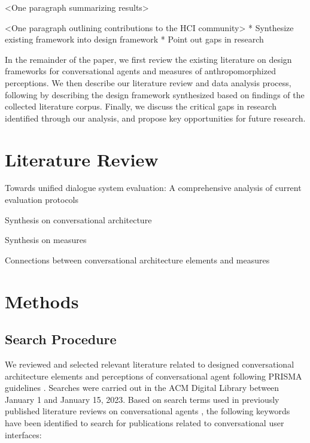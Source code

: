 \documentclass[sigconf,screen,review, anonymous]{acmart}
\begin{document}
<One paragraph summarizing results>

<One paragraph outlining contributions to the HCI community>
* Synthesize existing framework into design framework \newline
* Point out gaps in research \newline

In the remainder of the paper, we first review the existing literature on design frameworks for conversational agents and measures of anthropomorphized perceptions. We then describe our literature review and data analysis process, following by describing the design framework synthesized based on findings of the collected literature corpus. Finally, we discuss the critical gaps in research identified through our analysis, and propose key opportunities for future research.

\section{Literature Review}

\cite{finch2020towards} Towards unified dialogue system evaluation: A comprehensive analysis of current evaluation protocols

Synthesis on conversational architecture

Synthesis on measures

Connections between conversational architecture elements and measures


\section{Methods}

\subsection{Search Procedure}

We reviewed and selected relevant literature related to designed conversational architecture elements and perceptions of conversational agent following PRISMA guidelines \cite{prisma}. Searches were carried out in the ACM Digital Library between January 1 and January 15, 2023. Based on search terms used in previously published literature reviews on conversational agents \cite{clark2019state}\cite{rapp2021human} , the following keywords have been identified to search for publications related to conversational user interfaces:
\newline
\end{document}
